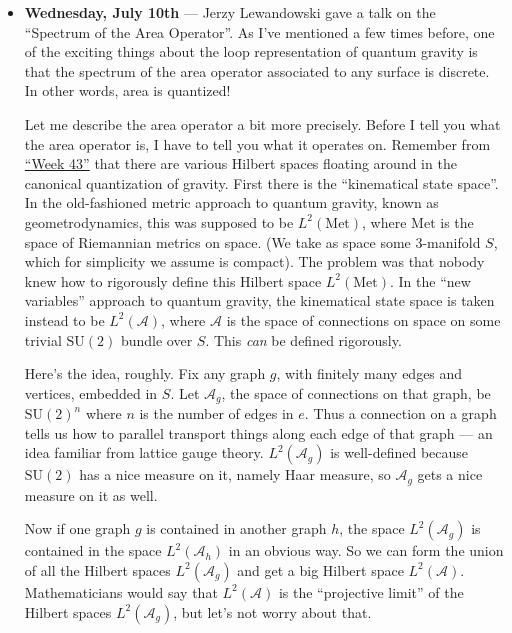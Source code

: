 \documentclass{article}
\begin{document}
\begin{itemize}
\item
  \textbf{Wednesday, July 10th} --- Jerzy Lewandowski gave a talk on the
  ``Spectrum of the Area Operator''. As I've mentioned a few times
  before, one of the exciting things about the loop representation of
  quantum gravity is that the spectrum of the area operator associated
  to any surface is discrete. In other words, area is quantized!

  Let me describe the area operator a bit more precisely. Before I tell
  you what the area operator is, I have to tell you what it operates on.
  Remember from \protect\hyperlink{week43}{``Week 43''} that there are
  various Hilbert spaces floating around in the canonical quantization
  of gravity. First there is the ``kinematical state space''. In the
  old-fashioned metric approach to quantum gravity, known as
  geometrodynamics, this was supposed to be \(L^2(\mathrm{Met})\), where
  \(\mathrm{Met}\) is the space of Riemannian metrics on space. (We take
  as space some 3-manifold \(S\), which for simplicity we assume is
  compact). The problem was that nobody knew how to rigorously define
  this Hilbert space \(L^2(\mathrm{Met})\). In the ``new variables''
  approach to quantum gravity, the kinematical state space is taken
  instead to be \(L^2(\mathcal{A})\), where \(\mathcal{A}\) is the space
  of connections on space on some trivial \(\mathrm{SU}(2)\) bundle over
  \(S\). This \emph{can} be defined rigorously.

  Here's the idea, roughly. Fix any graph \(g\), with finitely many
  edges and vertices, embedded in \(S\). Let \(\mathcal{A}_g\), the
  space of connections on that graph, be \(\mathrm{SU}(2)^n\) where
  \(n\) is the number of edges in \(e\). Thus a connection on a graph
  tells us how to parallel transport things along each edge of that
  graph --- an idea familiar from lattice gauge theory.
  \(L^2(\mathcal{A}_g)\) is well-defined because \(\mathrm{SU}(2)\) has
  a nice measure on it, namely Haar measure, so \(\mathcal{A}_g\) gets a
  nice measure on it as well.

  Now if one graph \(g\) is contained in another graph \(h\), the space
  \(L^2(\mathcal{A}_g)\) is contained in the space
  \(L^2(\mathcal{A}_h)\) in an obvious way. So we can form the union of
  all the Hilbert spaces \(L^2(\mathcal{A}_g)\) and get a big Hilbert
  space \(L^2(\mathcal{A})\). Mathematicians would say that
  \(L^2(\mathcal{A})\) is the ``projective limit'' of the Hilbert spaces
  \(L^2(\mathcal{A}_g)\), but let's not worry about that.


\end{itemize}
\end{document}
